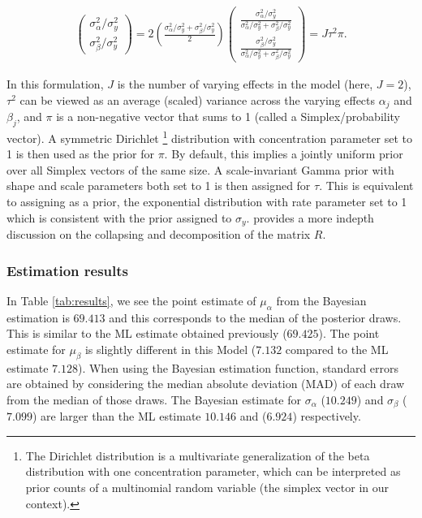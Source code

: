 \begin{align}
	\left(\begin{matrix}
		\sigma_\alpha^2/\sigma_y^2 \\
		\sigma_\beta^2/\sigma_y^2
	\end{matrix} \right) =
	2\left(\frac{\sigma_\alpha^2/\sigma_y^2 + \sigma_\beta^2/\sigma_y^2}{2}\right)\left(\begin{matrix}
		\frac{\sigma_\alpha^2/\sigma_y^2}{\sigma_\alpha^2/\sigma_y^2 + \sigma_\beta^2/\sigma_y^2} \\
		\frac{\sigma_\beta^2/\sigma_y^2}{\sigma_\alpha^2/\sigma_y^2 + \sigma_\beta^2/\sigma_y^2}
	\end{matrix} \right)=
	J\tau^2 \pi.
\end{align}



In this formulation, $J$ is the number of varying effects in the model (here, $J=2$), $\tau^2$ can be viewed as an average (scaled) variance across the varying effects $\alpha_j$ and $\beta_j$, and $\pi$ is a non-negative vector that sums to 1 (called a Simplex/probability vector).  A symmetric Dirichlet \footnote{The Dirichlet distribution is a multivariate generalization of the beta distribution with one concentration parameter, which can be interpreted as prior counts of a multinomial random variable (the simplex vector in our context).} distribution with concentration parameter set to 1 is then used as the prior for $\pi$.  By default, this implies a jointly uniform prior over all Simplex vectors of the same size.  A scale-invariant Gamma prior with shape and scale parameters both set to 1 is then assigned for $\tau$.  This is equivalent to assigning as a prior, the exponential distribution with rate parameter set to 1 which is consistent with the prior assigned to $\sigma_y$. \cite{lewandowski2009generating} provides a more indepth discussion on the collapsing and decomposition of the matrix $R$.

\subsubsection*{Estimation results}
In Table \ref{tab:results}, we see the point estimate of $\mu_{\alpha}$ from the Bayesian estimation is $69.413$ and this corresponds to the median of the posterior draws.  This is similar to the ML estimate obtained previously ($69.425$).  The point estimate for $\mu_{\beta}$  is slightly different in this Model ($7.132$ compared to the ML estimate $7.128$). When using the Bayesian estimation function, standard errors are obtained by considering the median absolute deviation (MAD) of each draw from the median of those draws.  The Bayesian estimate for $\sigma_{\alpha}$ ($10.249$) and $\sigma_{\beta}$ ($7.099$) are larger than the ML estimate $10.146$ and ($6.924$) respectively. 


